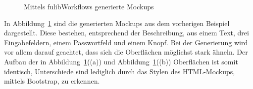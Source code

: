 \begin{figure}%
    \centering
    \qquad
    \caption{Mittels fulibWorkflows generierte Mockups}%
    \label{fig:mockups}%
\end{figure}

In Abbildung~\ref{fig:mockups} sind die generierten Mockups aus dem vorherigen Beispiel dargestellt.
Diese bestehen, entsprechend der Beschreibung, aus einem Text, drei Eingabefeldern, einem Passwortfeld und einem Knopf.
Bei der Generierung wird vor allem darauf geachtet, dass sich die Oberflächen möglichst stark ähneln.
Der Aufbau der in Abbildung~\ref{fig:mockups}((a)) und Abbildung~\ref{fig:mockups}((b)) Oberflächen ist somit identisch, Unterschiede
sind lediglich durch das Stylen des HTML-Mockups, mittels Bootstrap, zu erkennen.

